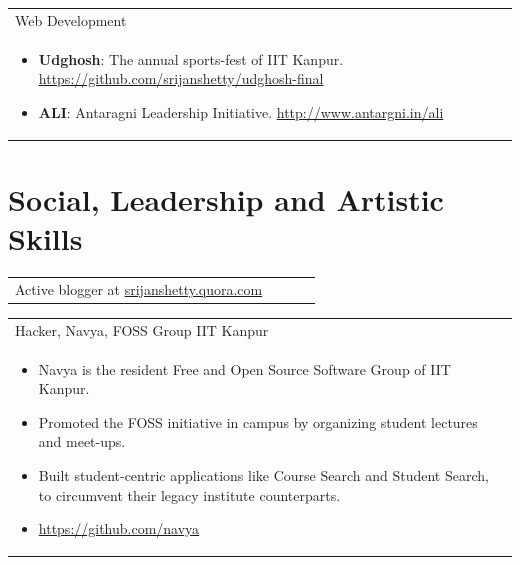 \documentclass[a4paper,10pt]{article} %
\newcommand{\projectlist}[2]{
    \begin{tabular}{p{\linewidth}}
        \textcolor{NavyBlue}{#1}\\
        \vspace{-0.3cm}
        \footnotesize{#2}
    \end{tabular}
    \vspace{-0.4cm}
}
\newcommand{\skill}[2]{
    \begin{tabular}{p{0.85\linewidth}r}
        #2 & \multicolumn{1}{m{3cm}}{\raggedleft \textsc{#1}}\\
    \end{tabular}
    \vspace{-0.5cm}
}
\begin{document}
\projectlist {Web Development}
             {
                 \begin{itemize}[leftmargin=0.5cm]
                     \item \textbf{Udghosh}: The annual sports-fest of IIT Kanpur.
                         \href{https://github.com/srijanshetty/udghosh-final}{https://github.com/srijanshetty/udghosh-final}
                     \item \textbf{ALI}: Antaragni Leadership Initiative.
                         \href{http://www.antargni.in/ali} {http://www.antargni.in/ali}
                 \end{itemize}
             }


\section {Social, Leadership and Artistic Skills}

\skill {}
       {Active blogger at \href{srijanshetty.quora.com} {srijanshetty.quora.com}}

\projectlist {Hacker, Navya, FOSS Group IIT Kanpur}
             {
                   \begin{itemize}[leftmargin=0.5cm]
                       \item Navya is the resident Free and Open Source Software Group of IIT Kanpur.
                       \item Promoted the FOSS initiative in campus by organizing student lectures and meet-ups.
                       \item Built student-centric applications like Course Search and Student Search, to circumvent
                           their legacy institute counterparts.
                       \item \href{https://github.com/navya} {https://github.com/navya}
                   \end{itemize}
             }
\end{document}
